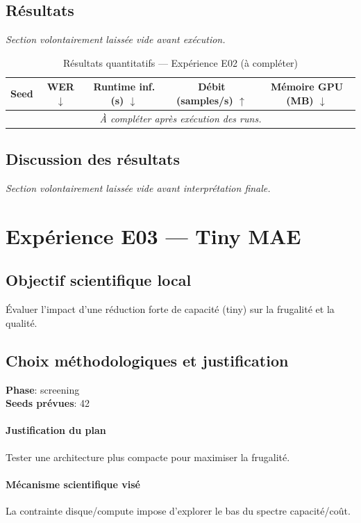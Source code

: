 \documentclass[11pt,a4paper]{article}
\begin{document}
\subsection{Résultats}
\textit{Section volontairement laissée vide avant exécution.}

\begin{table}[H]
\centering
\caption{Résultats quantitatifs --- Expérience E02 (à compléter)}
\begin{tabular}{lcccc}
\toprule
Seed & WER $\downarrow$ & Runtime inf. (s) $\downarrow$ & Débit (samples/s) $\uparrow$ & Mémoire GPU (MB) $\downarrow$ \\
\midrule
\multicolumn{5}{c}{\textit{À compléter après exécution des runs.}} \\
\bottomrule
\end{tabular}
\end{table}

\subsection{Discussion des résultats}
\textit{Section volontairement laissée vide avant interprétation finale.}


\section{Expérience E03 --- Tiny MAE}
\subsection{Objectif scientifique local}
Évaluer l'impact d'une réduction forte de capacité (tiny) sur la frugalité et la qualité.

\subsection{Choix méthodologiques et justification}
\textbf{Phase}: screening\\
\textbf{Seeds prévues}: 42\\


\paragraph{Justification du plan}
Tester une architecture plus compacte pour maximiser la frugalité.

\paragraph{Mécanisme scientifique visé}
La contrainte disque/compute impose d'explorer le bas du spectre capacité/coût.
\end{document}
